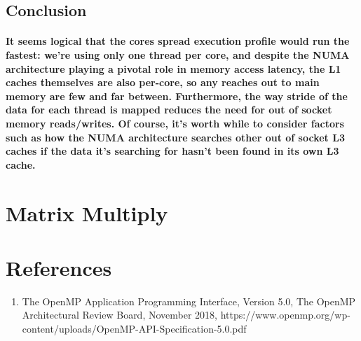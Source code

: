 \documentclass{article}
\begin{document}
\subsection{Conclusion}

\paragraph{It seems logical that the cores spread execution profile would run the fastest: we're using only one thread per core, and despite the NUMA architecture playing a pivotal role in memory access latency, the L1 caches themselves are also per-core, so any reaches out to main memory are few and far between. Furthermore, the way stride of the data for each thread is mapped reduces the need for out of socket memory reads/writes. Of course, it's worth while to consider factors such as how the NUMA architecture searches other out of socket L3 caches if the data it's searching for hasn't been found in its own L3 cache.}


\section{Matrix Multiply}

\section{References}

\begin {enumerate}
\item The OpenMP Application Programming Interface, Version 5.0, The OpenMP Architectural Review Board, November 2018,
  https://www.openmp.org/wp-content/uploads/OpenMP-API-Specification-5.0.pdf
\end{enumerate}
\end{document}
